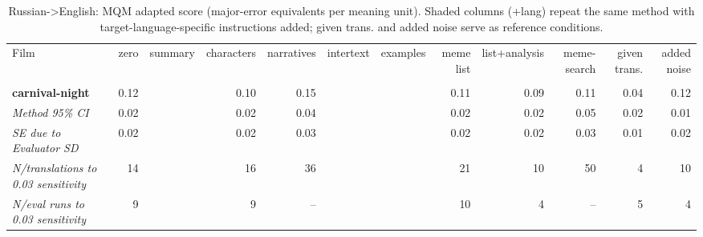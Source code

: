 \begin{table}[ht]
\centering
\begin{adjustbox}{width=\textwidth}
\begin{tabular}{lrrrrrrrrr|rr}
Film & zero & summary & characters & narratives & intertext & examples & meme list & list+analysis & meme-search & \multicolumn{1}{|r}{given trans.} & added noise \\
 &  &  &  &  &  &  &  &  &  &  &  \\
\hline
\textbf{carnival-night} & 0.12 &  & 0.10 & 0.15 &  &  & 0.11 & 0.09 & 0.11 & 0.04 & 0.12 \\

\emph{Method 95\% CI} & 0.02 &  & 0.02 & 0.04 &  &  & 0.02 & 0.02 & 0.05 & 0.02 & 0.01 \\

\emph{SE due to Evaluator SD} & 0.02 &  & 0.02 & 0.03 &  &  & 0.02 & 0.02 & 0.03 & 0.01 & 0.02 \\

\emph{N/translations to 0.03 sensitivity} & 14 &  & 16 & 36 &  &  & 21 & 10 & 50 & 4 & 10 \\

\emph{N/eval runs to 0.03 sensitivity} & 9 &  & 9 & -- &  &  & 10 & 4 & -- & 5 & 4 \\

\hline
\end{tabular}
\end{adjustbox}
\caption{Russian->English: MQM adapted score (major-error equivalents per meaning unit). Shaded columns (+lang) repeat the same method with target-language-specific instructions added; given trans. and added noise serve as reference conditions.}
\label{tab:mqm-method-comparison}
\end{table}
